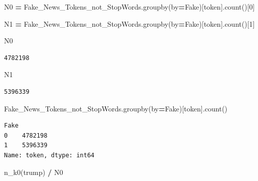 \documentclass[
  11pt,
  a4paper,
]{article}
\newenvironment{Shaded}{\begin{snugshade}}{\end{snugshade}}
\newcommand{\DecValTok}[1]{\textcolor[rgb]{0.00,0.00,0.81}{#1}}
\newcommand{\NormalTok}[1]{#1}
\newcommand{\OperatorTok}[1]{\textcolor[rgb]{0.81,0.36,0.00}{\textbf{#1}}}
\newcommand{\StringTok}[1]{\textcolor[rgb]{0.31,0.60,0.02}{#1}}
\begin{document}
\begin{Shaded}
\begin{Highlighting}[]
\NormalTok{N0 }\OperatorTok{=}\NormalTok{ Fake\_News\_Tokens\_not\_StopWords.groupby(by}\OperatorTok{=}\StringTok{\textquotesingle{}Fake\textquotesingle{}}\NormalTok{)[}\StringTok{\textquotesingle{}token\textquotesingle{}}\NormalTok{].count()[}\DecValTok{0}\NormalTok{]}

\NormalTok{N1 }\OperatorTok{=}\NormalTok{ Fake\_News\_Tokens\_not\_StopWords.groupby(by}\OperatorTok{=}\StringTok{\textquotesingle{}Fake\textquotesingle{}}\NormalTok{)[}\StringTok{\textquotesingle{}token\textquotesingle{}}\NormalTok{].count()[}\DecValTok{1}\NormalTok{]}
\end{Highlighting}
\end{Shaded}

\begin{Shaded}
\begin{Highlighting}[]
\NormalTok{N0}
\end{Highlighting}
\end{Shaded}

\begin{verbatim}
4782198
\end{verbatim}

\begin{Shaded}
\begin{Highlighting}[]
\NormalTok{N1}
\end{Highlighting}
\end{Shaded}

\begin{verbatim}
5396339
\end{verbatim}

\begin{Shaded}
\begin{Highlighting}[]
\NormalTok{Fake\_News\_Tokens\_not\_StopWords.groupby(by}\OperatorTok{=}\StringTok{\textquotesingle{}Fake\textquotesingle{}}\NormalTok{)[}\StringTok{\textquotesingle{}token\textquotesingle{}}\NormalTok{].count()}
\end{Highlighting}
\end{Shaded}

\begin{verbatim}
Fake
0    4782198
1    5396339
Name: token, dtype: int64
\end{verbatim}

\begin{Shaded}
\begin{Highlighting}[]
\NormalTok{n\_k0(}\StringTok{\textquotesingle{}trump\textquotesingle{}}\NormalTok{) }\OperatorTok{/}\NormalTok{ N0 }
\end{Highlighting}
\end{Shaded}
\end{document}
